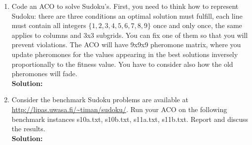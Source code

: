 \documentclass[a4paper]{article}
\begin{document}
\begin{enumerate}
	\begin{enumerate}
		\item Code an ACO to solve Sudoku's. First, you need to think how to represent Sudoku: there are three conditions an optimal solution must fulfill, each line must contain all integers $\{1,2,3,4,5,6,7,8,9 \}$ once and only once, the same applies to columns and 3x3 subgrids. You can fix one of them so that you will prevent violations. The ACO will have 9x9x9 pheromone matrix, where you update pheromones for the values appearing in the best solutions inversely proportionally to the fitness value. You have to consider also how the old pheromones will fade.\\
		\textbf{Solution:}\\
		
		
		\item Consider the benchmark Sudoku problems are available at \url{http://lipas.uwasa.fi/~timan/sudoku/}. Run your ACO on the following benchmark instances \textsf{s10a.txt, s10b.txt, s11a.txt, s11b.txt}. Report and discuss the results.\\
		 \textbf{Solution:}\\
		
		
		
	\end{enumerate}
	
\end{enumerate}
\end{document}
